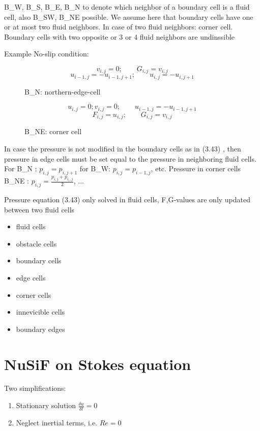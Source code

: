 \documentclass[a4paper,11pt]{scrartcl}
\begin{document}
B\_W, B\_S, B\_E, B\_N to denote which neighbor of a boundary cell is a fluid cell, also B\_SW, B\_NE possible. We assume here that boundary cells have one or at most two fluid neighbors. In case of two fluid neighbors: corner cell. Boundary cells with two opposite or 3 or 4 fluid neighbors are undinssible %

Example No-slip condition:
\begin{figure}[H]
	\centering
	\[ v_{i,j} = 0; \qquad G_{i,j} = v_{i,j} \]
	\[ u_{i-1,j} = -u_{i-1,j+1}; \qquad u_{i,j} = - u_{i,j+1} \]
	\renewcommand{\thefigure}{TODO}
	\caption{B\_N: northern-edge-cell}
	\label{fig:disc-freesplipb}
\end{figure}

\begin{figure}[H]
	\centering
	\[ u_{i,j} = 0; v_{i,j} = 0; \qquad u_{i-1,j} = - u_{i-1,j+1} \]
	\[ F_{i,j} = u_{i,j}; \qquad G_{i,j} = v_{i,j} \]
	\renewcommand{\thefigure}{3.53}
	\caption{B\_NE: corner cell}
	\label{fig:disc-freesplipb}
\end{figure}

In case the pressure is not modified in the boundary cells as in (3.43) %
, then pressure in edge cells must be set equal to the pressure in neighboring fluid cells. For B\_N : $p_{i,j} = p_{i,j+1}$ for B\_W: $p_{i,j} = p_{i-1,j}$, etc. Pressure in corner cells B\_NE : $p_{i,j} = \frac{p_{i,j} + p_{i_1,j}}{2}$, ...

Pressure equation (3.43) %
only solved in fluid cells, F,G-values are only updated between two fluid cells
\begin{itemize}
	\item fluid cells
	\item obstacle cells
	\item boundary cells
	\item edge cells
	\item corner cells
	\item innevicible cells
	\item boundary edges
\end{itemize}



\section*{NuSiF on Stokes equation}
Two simplifications:
\begin{enumerate}
	\item Stationary solution $\frac{\delta u}{\delta t} = 0$
	\item Neglect inertial terms, i.e. $Re = 0$
\end{enumerate}
\end{document}
